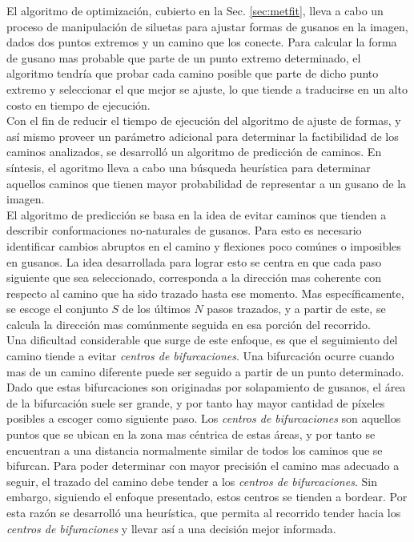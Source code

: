 El algoritmo de optimizaci\'on, cubierto en la Sec. \ref{sec:metfit}, lleva a cabo un
proceso de manipulaci\'on de siluetas para ajustar formas de gusanos en la imagen, dados
dos puntos extremos y un camino que los conecte. Para calcular la forma de gusano mas probable
que parte de un punto extremo determinado, el algoritmo tendr\'ia que probar cada camino posible
que parte de dicho punto extremo y seleccionar el que mejor se ajuste, lo que tiende a traducirse  
en un alto costo en tiempo de ejecuci\'on.\\
Con el fin de reducir el tiempo de ejecuci\'on del algoritmo de ajuste de
formas, y as\'i mismo proveer un par\'ametro adicional para determinar la
factibilidad de los caminos analizados, se desarroll\'o un algoritmo de
predicci\'on de caminos. En s\'intesis, el agoritmo lleva a cabo una b\'usqueda
heur\'istica para determinar aquellos caminos que tienen mayor probabilidad
de representar a un gusano de la imagen.\\

El algoritmo de predicci\'on se basa en la idea de evitar caminos que
tienden a describir conformaciones no-naturales de gusanos. Para esto
es necesario identificar cambios abruptos en el camino y flexiones
poco com\'unes o imposibles en gusanos. La idea desarrollada para lograr
esto se centra en que cada paso siguiente que sea seleccionado, corresponda
a la direcci\'on mas coherente con respecto al camino que ha sido
trazado hasta ese momento. 
Mas espec\'ificamente, se escoge el conjunto $S$ de los \'ultimos $N$ 
pasos trazados, y a partir de este, se calcula la direcci\'on mas com\'unmente
seguida en esa porci\'on del recorrido.\\

Una dificultad considerable que surge de este
enfoque, es que el seguimiento del camino tiende a evitar \emph{centros de bifurcaciones}.
Una bifurcaci\'on ocurre cuando mas de un camino diferente puede ser seguido a partir
de un punto determinado. Dado que estas bifurcaciones son originadas por solapamiento 
de gusanos, el \'area de la bifurcaci\'on suele ser grande, y por tanto hay mayor 
cantidad de p\'ixeles posibles a escoger como siguiente paso. Los \emph{centros de bifurcaciones}
son aquellos puntos que se ubican en la zona mas c\'entrica de estas \'areas, y por tanto
se encuentran a una distancia normalmente similar de todos los caminos que se bifurcan.
Para poder determinar con mayor precisi\'on el camino mas adecuado a seguir, el trazado del camino 
debe tender a los \emph{centros de bifurcaciones}. Sin embargo, siguiendo el enfoque presentado, estos
centros se tienden a bordear. Por esta raz\'on se desarroll\'o una heur\'istica, que permita
al recorrido tender hacia los \emph{centros de bifuraciones} y llevar as\'i a una 
decisi\'on mejor informada.\\

